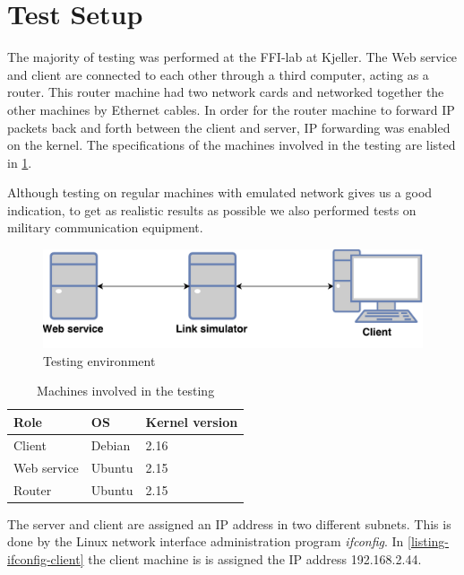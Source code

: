 \section{Test Setup}
\label{testing-environment}

The majority of testing was performed at the FFI-lab at Kjeller.  The Web
service and client are connected to each other through a third computer, acting
as a router. This router machine had two network cards and networked together
the other machines by Ethernet cables. In order for the router machine to
forward IP packets back and forth between the client and server, IP forwarding
was enabled on the kernel. The specifications of the machines involved in the
testing are listed in \cref{table-machines}.

Although testing on regular machines with emulated network gives us a good
indication, to get as realistic results as possible we also performed tests on
military communication equipment.

\begin{figure}[h]
\includegraphics[scale=0.6]{images/testing_environment.pdf}
\caption{Testing environment}
\label{figure-testing-environment}
\end{figure}


\begin{table}[h]
\begin{tabular}{| l | l | l |}
\hline
  \textbf{Role} & \textbf{OS} & \textbf{Kernel version}\\ \hline
  Client & Debian & 2.16 \\ \hline
  Web service & Ubuntu & 2.15 \\ \hline
  Router & Ubuntu & 2.15 \\ \hline
\end{tabular}
\caption{Machines involved in the testing}
\label{table-machines}
\end{table}


The server and client are assigned an IP address in two different subnets.
This is done by the Linux network interface administration program
\textit{ifconfig}. In \cref{listing-ifconfig-client} the client machine is is
assigned the IP address 192.168.2.44.

